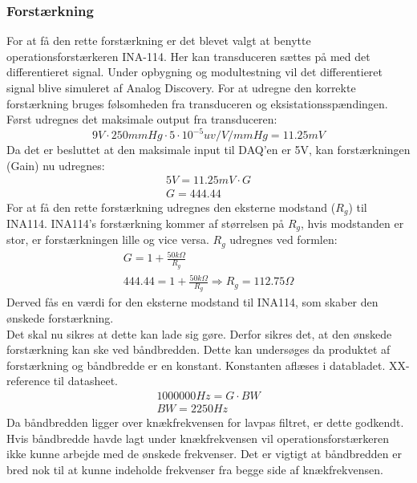 \subsubsection{Forstærkning}
For at få den rette forstærkning er det blevet valgt at benytte operationsforstærkeren INA-114. Her kan transduceren sættes på med det differentieret signal. Under opbygning og modultestning vil det differentieret signal blive simuleret af Analog Discovery. For at udregne den korrekte forstærkning bruges følsomheden fra transduceren og eksistationsspændingen.
Først udregnes det maksimale output fra transduceren:   
\begin{equation}
9V\cdot 250mmHg \cdot 5\cdot 10^{-5} uv/V/mmHg  = 11.25mV
\end{equation} 
Da det er besluttet at den maksimale input til DAQ'en er 5V, kan forstærkningen (Gain) nu udregnes: 
\begin{equation}
\begin{split}
5V= 11.25mV \cdot G \\
G = 444.44
\end{split}
\end{equation}
For at få den rette forstærkning udregnes den eksterne modstand ($ R_g $) til INA114. INA114's forstærkning kommer af størrelsen på $ R_g $, hvis modstanden er stor, er forstærkningen lille og vice versa.  $ R_g $ udregnes ved formlen: 
\begin{equation}
\begin{split}
G=1+\frac{50k\Omega}{R_g}\\
444.44= 1+\frac{50k\Omega}{R_g} \Rightarrow R_g= 112.75 \Omega
\end{split}
\end{equation}
Derved fås en værdi for den eksterne modstand til INA114, som skaber den ønskede forstærkning.\\
Det skal nu sikres at dette kan lade sig gøre. Derfor sikres det, at den ønskede forstærkning kan ske ved båndbredden. Dette kan undersøges da produktet af forstærkning og båndbredde er en konstant. Konstanten aflæses i databladet. XX-reference til datasheet. 
\begin{equation}
\begin{split}
1000000 Hz = G\cdot BW \\
BW = 2250 Hz
\end{split}
\end{equation}
Da båndbredden ligger over knækfrekvensen for lavpas filtret, er dette godkendt. Hvis båndbredde havde lagt under knækfrekvensen vil operationsforstærkeren ikke kunne arbejde med de ønskede frekvenser. Det er vigtigt at båndbredden er bred nok til at kunne indeholde frekvenser fra begge side af knækfrekvensen.\\
